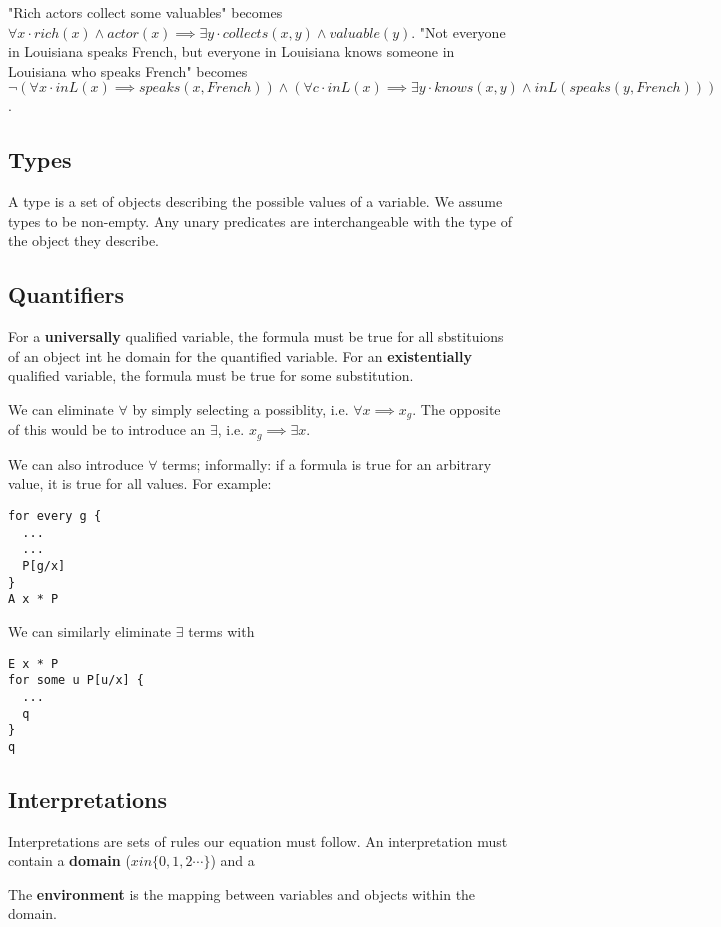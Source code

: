 \documentclass[12pt]{article}
\begin{document}
"Rich actors collect some valuables" becomes $\forall x \cdot rich(x) \land actor(x) \implies \exists y \cdot collects(x,y) \land valuable(y)$. "Not everyone in Louisiana speaks French, but everyone in Louisiana knows someone in Louisiana who speaks French" becomes $\neg (\forall x \cdot inL(x) \implies speaks(x, French)) \land (\forall c \cdot inL(x) \implies \exists y \cdot knows(x,y) \land inL(speaks(y, French)))$.

\subsection*{Types}
A type is a set of objects describing the possible values of a variable. We assume types to be non-empty. Any unary predicates are interchangeable with the type of the object they describe.

\subsection*{Quantifiers}
For a {\bf universally} qualified variable, the formula must be true for all sbstituions of an object int he domain for the quantified variable. For an {\bf existentially} qualified variable, the formula must be true for some substitution.

We can eliminate $\forall$ by simply selecting a possiblity, i.e. $\forall x \implies x_g$. The opposite of this would be to introduce an $\exists$, i.e. $x_g \implies \exists x$.

We can also introduce $\forall$ terms; informally: if a formula is true for an arbitrary value, it is true for all values. For example:
\begin{verbatim}
for every g {
  ...
  ...
  P[g/x]
}
A x * P
\end{verbatim}

We can similarly eliminate $\exists$ terms with
\begin{verbatim}
E x * P
for some u P[u/x] {
  ...
  q
}
q
\end{verbatim}

\subsection*{Interpretations}
Interpretations are sets of rules our equation must follow. An interpretation must contain a {\bf domain} ($x in \{0, 1, 2 \cdots\}$) and a

The {\bf environment} is the mapping between variables and objects within the domain.
\end{document}
